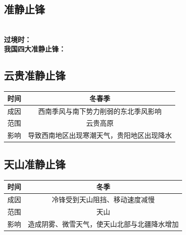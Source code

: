\documentclass[UTF8]{ctexart}
\begin{document}
    \subsection*{准静止锋}
    \noindent
    \\
    \textbf{过境时：}
    \\
    \textbf{我国四大准静止锋：}

    \subsection*{云贵准静止锋}

    \begin{table}[h]
        \begin{center}
            \begin{tabular}{ |c|c| }
                \hline 时间 & 冬春季 \\
                \hline 成因 & 西南季风与南下势力削弱的东北季风影响 \\
                \hline 范围 & 云贵高原 \\
                \hline 影响 & 导致西南地区出现寒潮天气，贵阳地区出现降水 \\
                \hline
            \end{tabular}
        \end{center}
    \end{table}

    \subsection*{天山准静止锋}

    \begin{table}[h]
        \begin{center}
            \begin{tabular}{ |c|c| }
                \hline 时间 & 冬季 \\
                \hline 成因 & 冷锋受到天山阻挡、移动速度减慢 \\
                \hline 范围 & 天山 \\
                \hline 影响 & 造成阴雾、微雪天气，使天山北部与北疆降水增加 \\
                \hline
            \end{tabular}
        \end{center}
    \end{table}
\end{document}

